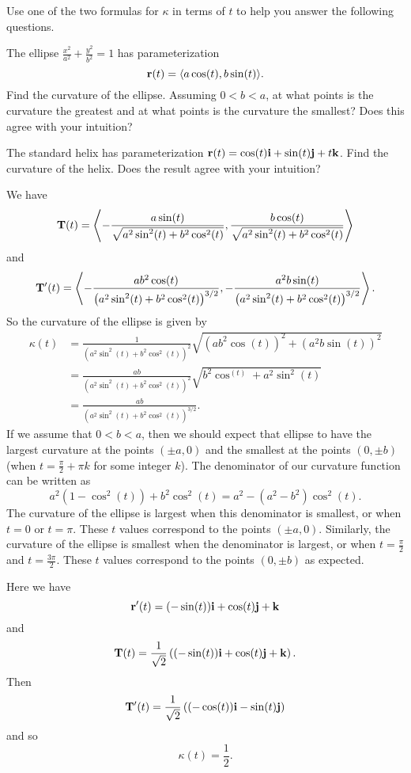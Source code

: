 \begin{activity} \label{A:9.8.6} Use one of the two formulas for $\kappa$ in terms of $t$ to help you answer the following questions.
\ba
	\item The ellipse $\frac{x^2}{a^2} + \frac{y^2}{b^2} = 1$ has parameterization
\[\mathbf{r}(t) = \langle a\cos(t), b\sin(t) \rangle.\]
Find the curvature of the ellipse. Assuming $0 < b < a$, at what points is the curvature the greatest and at what points is the curvature the smallest? Does this agree with your intuition?
	\item The standard helix has parameterization $\mathbf{r}(t) = \cos(t) \mathbf{i} + \sin(t) \mathbf{j} + t \mathbf{k}$.  Find the curvature of the helix.  Does the result agree with your intuition?
\ea
\end{activity}
\begin{smallhint}

\end{smallhint}
\begin{bighint}

\end{bighint}
\begin{activitySolution}
\ba
	\item We have
\[\mathbf{T}(t) = \left\langle -\frac{a\sin(t)}{\sqrt{a^2\sin^2(t) + b^2\cos^2(t)}}, \frac{b\cos(t)}{\sqrt{a^2\sin^2(t) + b^2\cos^2(t)}} \right\rangle\]
and
\[\mathbf{T}'(t) = \left\langle -\frac{ab^2\cos(t)}{\left(a^2\sin^2(t) + b^2\cos^2(t)\right)^{3/2}}, -\frac{a^2b\sin(t)}{\left(a^2\sin^2(t) + b^2\cos^2(t)\right)^{3/2}} \right\rangle.\]
So the curvature of the ellipse is given by
\begin{align*}
\kappa(t) &= \frac{1}{\left(a^2\sin^2(t) + b^2\cos^2(t)\right)^2} \sqrt{(ab^2\cos(t))^2 +(a^2b\sin(t))^2} \\
    &= \frac{ab}{\left(a^2\sin^2(t) + b^2\cos^2(t)\right)^2} \sqrt{b^2\cos^(t) + a^2\sin^2(t)} \\
    &= \frac{ab}{\left(a^2\sin^2(t) + b^2\cos^2(t)\right)^{3/2}}.
\end{align*}
If we assume that $0 < b < a$, then we should expect that ellipse to have the largest curvature at the points $(\pm a, 0)$ and the smallest at the points $(0, \pm b)$ (when $t = \frac{\pi}{2} + \pi k$ for some integer $k$). The denominator of our curvature function can be written as
\[a^2(1-\cos^2(t)) + b^2 \cos^2(t) = a^2 - (a^2-b^2)\cos^2(t).\]
The curvature of the ellipse is largest when this denominator is smallest, or when $t = 0$ or $t=\pi$. These $t$ values correspond to the points $(\pm a, 0)$. Similarly, the curvature of the ellipse is smallest when the denominator is largest, or when $t = \frac{\pi}{2}$ and $t = \frac{3\pi}{2}$. These $t$ values correspond to the points $(0, \pm b)$ as expected.
	\item Here we have
\[\mathbf{r}'(t) = (-\sin(t)) \mathbf{i} + \cos(t) \mathbf{j} + \mathbf{k}\]
and
\[\mathbf{T}(t) = \frac{1}{\sqrt{2}}\left( (-\sin(t)) \mathbf{i} + \cos(t) \mathbf{j} + \mathbf{k} \right).\]
Then
\[\mathbf{T}'(t) = \frac{1}{\sqrt{2}}\left( (-\cos(t)) \mathbf{i} - \sin(t) \mathbf{j} \right)\]
and so
\[\kappa(t) = \frac{1}{2}.\]
\ea
\end{activitySolution}
\aftera






